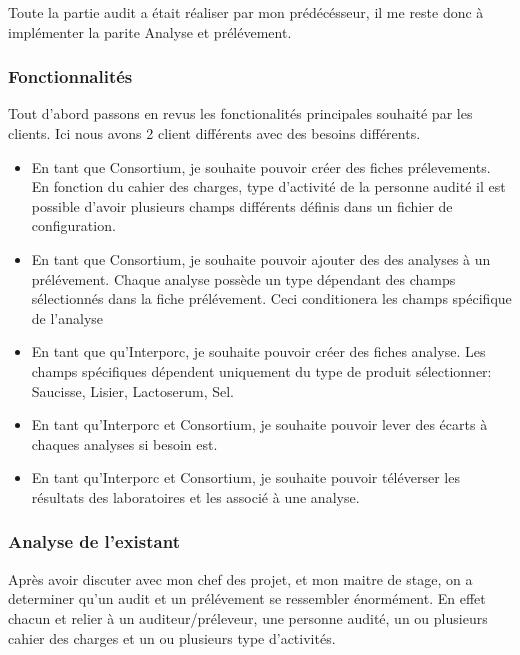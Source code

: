 Toute la partie audit a était réaliser par mon prédécésseur, il me reste donc à implémenter la parite Analyse et prélévement. 

\subsubsection{Fonctionnalités}
Tout d'abord passons en revus les fonctionalités principales souhaité par les clients. Ici nous avons 2 client différents avec des besoins différents.
\begin{itemize}
    \item En tant que Consortium, je souhaite pouvoir créer des fiches prélevements. En fonction du cahier des charges, type d'activité de la personne audité il est possible d'avoir plusieurs champs différents définis dans un fichier de configuration.
    \item En tant que Consortium, je souhaite pouvoir ajouter des des analyses à un prélévement. Chaque analyse possède un type dépendant des champs sélectionnés dans la fiche prélévement. Ceci conditionera les champs spécifique de l'analyse
    \item En tant que qu'Interporc, je souhaite pouvoir créer des fiches analyse. Les champs spécifiques dépendent uniquement du type de produit sélectionner: Saucisse, Lisier, Lactoserum, Sel. 
    \item En tant qu'Interporc et Consortium, je souhaite pouvoir lever des écarts à chaques analyses si besoin est.  
    \item En tant qu'Interporc et Consortium, je souhaite pouvoir téléverser les résultats des laboratoires et les associé à une analyse. 
\end{itemize}



\subsubsection{Analyse de l'existant}


Après avoir discuter avec mon chef des projet, et mon maitre de stage, on a determiner qu'un audit et un prélévement se ressembler énormément. En effet chacun et relier à un auditeur/préleveur, une personne audité, un ou plusieurs cahier des charges et un ou plusieurs type d'activités. 


